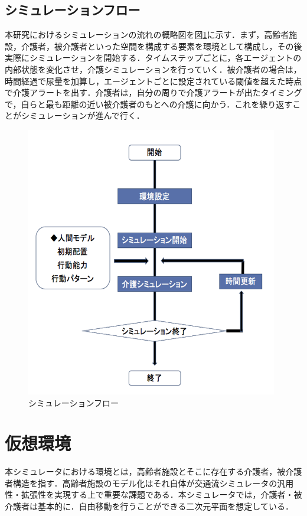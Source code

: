 \subsection{シミュレーションフロー}

本研究におけるシミュレーションの流れの概略図を図\ref{simulation_flow}に示す．まず，高齢者施設，介護者，被介護者といった空間を構成する要素を環境として構成し，その後実際にシミュレーションを開始する．タイムステップごとに，各エージェントの内部状態を変化させ，介護シミュレーションを行っていく．被介護者の場合は，時間経過で尿量を加算し，エージェントごとに設定されている閾値を超えた時点で介護アラートを出す．介護者は，自分の周りで介護アラートが出たタイミングで，自らと最も距離の近い被介護者のもとへの介護に向かう．これを繰り返すことがシミュレーションが進んで行く．

\begin{figure}[htb]
\begin{center}
 \includegraphics[scale=0.6]{figures/simulation_flow.png}
 \caption[シミュレーションフロー]{シミュレーションフロー \label{simulation_flow}}
\end{center}
\end{figure}

\section{仮想環境}
本シミュレータにおける環境とは，高齢者施設とそこに存在する介護者，被介護者構造を指す．高齢者施設のモデル化はそれ自体が交通流シミュレータの汎用性・拡張性を実現する上で重要な課題である．本シミュレータでは，介護者・被介護者は基本的に．自由移動を行うことができる二次元平面を想定している．

